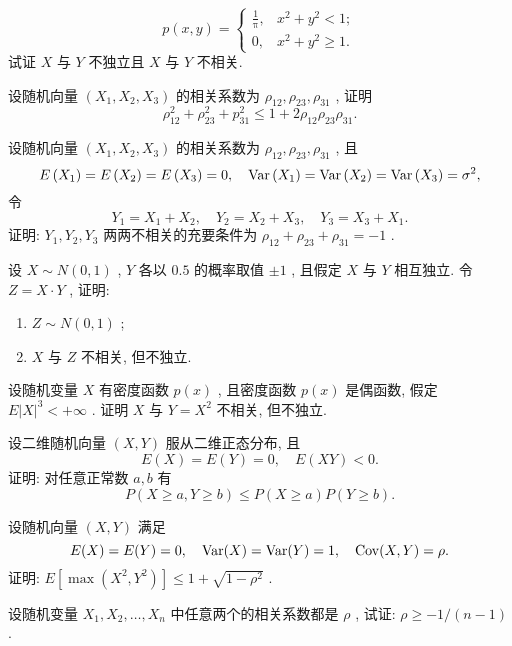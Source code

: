 \begin{xiti}
\begin{equation*}
					p(x,y)=\begin{cases}
						\frac{1}{\uppi}, & x^2+y^2<1;\\
						0, & x^2+y^2\geqslant 1.
					\end{cases}
				\end{equation*}
				试证 $X$ 与 $Y$ 不独立且 $X$ 与 $Y$ 不相关.
			\item 设随机向量 $(X_1,X_2,X_3)$ 的相关系数为 $\rho_{12},\rho_{23},\rho_{31}$ , 证明
				\begin{equation*}
					\rho_{12}^{2}+\rho_{23}^{2}+p_{31}^{2} \leqslant 1+2 \rho_{12} \rho_{23} \rho_{31}.
				\end{equation*}
			\item 设随机向量 $(X_1,X_2,X_3)$ 的相关系数为 $\rho_{12},\rho_{23},\rho_{31}$ , 且
				\begin{equation*}
					E\left(X_{1}\right)=E\left(X_{2}\right)=E\left(X_{3}\right)=0, \quad \operatorname{Var}\left(X_{1}\right)=\operatorname{Var}\left(X_{2}\right)=\operatorname{Var}\left(X_{3}\right)=\sigma^{2},
				\end{equation*}
				令
				\begin{equation*}
					Y_{1}=X_{1}+X_{2}, \quad Y_{2}=X_{2}+X_{3}, \quad Y_{3}=X_{3}+X_{1}.
				\end{equation*}
				证明: $Y_1,Y_2,Y_3$ 两两不相关的充要条件为 $\rho_{12}+\rho_{23}+\rho_{31}=-1$ .
			\item 设 $X\sim N(0,1)$ , $Y$ 各以 $0.5$ 的概率取值 $\pm 1$ , 且假定 $X$ 与 $Y$ 相互独立. 令 $Z=X \cdot Y$ , 证明:
				\begin{enumerate}
					\item $Z\sim N(0,1)$ ;
					\item $X$ 与 $Z$ 不相关, 但不独立.
				\end{enumerate}
			\item 设随机变量 $X$ 有密度函数 $p(x)$ , 且密度函数 $p(x)$ 是偶函数, 假定 $E|X|^3<+\infty$ . 证明 $X$ 与 $Y=X^2$ 不相关, 但不独立.
			\item 设二维随机向量 $(X,Y)$ 服从二维正态分布, 且
				\begin{equation*}
					E(X)=E(Y)=0, \quad E(X Y)<0.
				\end{equation*}
				证明: 对任意正常数 $a,b$ 有
				\begin{equation*}
					P(X \geqslant a, Y \geqslant b) \leqslant P(X \geqslant a) P(Y \geqslant b).
				\end{equation*}
			\item 设随机向量 $(X,Y)$ 满足
				\begin{equation*}
					E(X)=E(Y)=0, \quad \operatorname{Var}(X)=\operatorname{Var}(Y)=1, \quad \operatorname{Cov}(X, Y)=\rho.
				\end{equation*}
				证明: $E[\max\left(X^2,Y^2\right)]\leqslant 1+\sqrt{1-\rho^2}$ .
			\item 设随机变量 $X_1,X_2,\ldots,X_n$ 中任意两个的相关系数都是 $\rho$ , 试证: $\rho\geqslant -1/(n-1)$ .
	\end{xiti}


